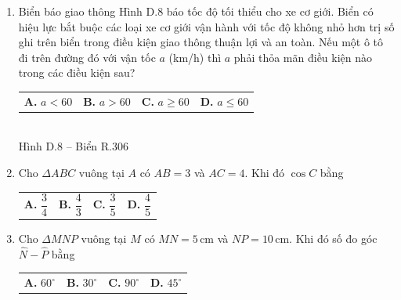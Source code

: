 \documentclass[12pt,a4paper]{article}
\begin{document}
\begin{enumerate}[label=\textbf{Câu \arabic*.}, leftmargin=*, itemsep=3.5pt, parsep=0pt]
  \item 
  \par\noindent
  \begin{minipage}[t]{0.78\linewidth}
    Biển báo giao thông Hình D.8 báo tốc độ tối thiểu cho xe cơ giới. Biển có hiệu lực bắt buộc các loại xe cơ giới vận hành với tốc độ không nhỏ hơn trị số ghi trên biển trong điều kiện giao thông thuận lợi và an toàn. Nếu một ô tô đi trên đường đó với vận tốc $a$ (km/h) thì $a$ phải thỏa mãn điều kiện nào trong các điều kiện sau?
    \begin{flushleft}
      \begin{tabularx}{\linewidth}{X X X X}
        \textbf{A.} $a < 60$ & 
        \textbf{B.} $a > 60$ & 
        \textbf{C.} $a \ge 60$ & 
        \textbf{D.} $a \le 60$
      \end{tabularx}
    \end{flushleft}
  \end{minipage}\hfill
  \begin{minipage}[t]{0.20\linewidth}
    \centering
    \vspace{-2mm}
    \\[1mm]
    {\scriptsize\textsf{Hình D.8 -- Biển R.306}}
  \end{minipage}

  \item Cho $\Delta ABC$ vuông tại $A$ có $AB = 3$ và $AC = 4$. Khi đó $\cos C$ bằng
  \begin{flushleft}
    \begin{tabularx}{\linewidth}{X X X X}
      \textbf{A.} $\dfrac{3}{4}$ & 
      \textbf{B.} $\dfrac{4}{3}$ & 
      \textbf{C.} $\dfrac{3}{5}$ & 
      \textbf{D.} $\dfrac{4}{5}$
    \end{tabularx}
  \end{flushleft}

  \item Cho $\Delta MNP$ vuông tại $M$ có $MN = 5\,\text{cm}$ và $NP = 10\,\text{cm}$. Khi đó số đo góc $\widehat{N} - \widehat{P}$ bằng
  \begin{flushleft}
    \begin{tabularx}{\linewidth}{X X X X}
      \textbf{A.} $60^\circ$ & 
      \textbf{B.} $30^\circ$ & 
      \textbf{C.} $90^\circ$ & 
      \textbf{D.} $45^\circ$
    \end{tabularx}
  \end{flushleft}


\end{enumerate}
\end{document}
